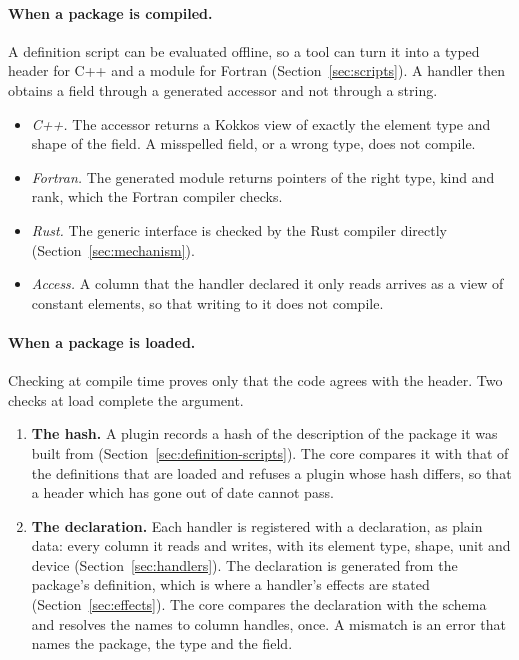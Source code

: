 \documentclass[11pt,a4paper]{article}
\begin{document}
\paragraph{When a package is compiled.}  A definition script can be
evaluated offline, so a tool can turn it into a typed header for C++ and a
module for Fortran (Section~\ref{sec:scripts}).  A handler then obtains a
field through a generated accessor and not through a string.

\begin{itemize}
  \item \emph{C++.}  The accessor returns a Kokkos view of exactly the
        element type and shape of the field.  A misspelled field, or a
        wrong type, does not compile.
  \item \emph{Fortran.}  The generated module returns pointers of the right
        type, kind and rank, which the Fortran compiler checks.
  \item \emph{Rust.}  The generic interface is checked by the Rust compiler
        directly (Section~\ref{sec:mechanism}).
  \item \emph{Access.}  A column that the handler declared it only reads
        arrives as a view of constant elements, so that writing to it does
        not compile.
\end{itemize}

\paragraph{When a package is loaded.}  Checking at compile time proves only
that the code agrees with the header.  Two checks at load complete the
argument.

\begin{enumerate}
  \item \textbf{The hash.}  A plugin records a hash of the description of
        the package it was built from
        (Section~\ref{sec:definition-scripts}).  The core compares it with
        that of the definitions that are loaded and refuses a plugin whose
        hash differs, so that a header which has gone out of date cannot
        pass.
  \item \textbf{The declaration.}  Each handler is registered with a
        declaration, as plain data: every column it reads and writes, with
        its element type, shape, unit and device
        (Section~\ref{sec:handlers}).  The declaration is generated from
        the package's definition, which is where a handler's effects are
        stated (Section~\ref{sec:effects}).  The core compares the declaration
        with the schema and resolves the names to column handles, once.  A
        mismatch is an error that names the package, the type and the
        field.
\end{enumerate}
\end{document}
